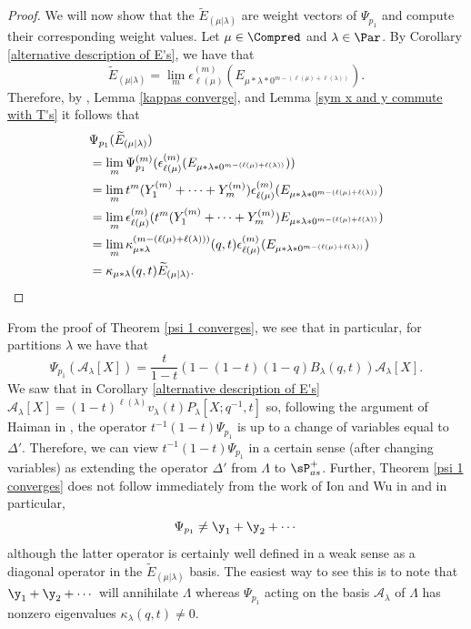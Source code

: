 \begin{proof}
We will now show that the $\widetilde{E}_{(\mu|\lambda)}$ are weight vectors of $\Psi_{p_1}$ and compute their corresponding weight values. Let $\mu \in \Compred$ and $\lambda \in \Par$. By Corollary \ref{alternative description of E's}, we have that 
$$ \widetilde{E}_{(\mu|\lambda)} = \lim_{m} \epsilon_{\ell(\mu)}^{(m)}(E_{\mu*\lambda*0^{m-(\ell(\mu)+\ell(\lambda))}}). $$
Therefore, by \cite[Proposition 6.21]{Ion_2022}, Lemma \ref{kappas converge}, and Lemma \ref{sym x and y commute with T's} it follows that 
\begin{align*}
   & \Psi_{p_1}(\widetilde{E}_{(\mu|\lambda)})\\
   &= \lim_{m} \Psi_{p_1}^{(m)}(\epsilon_{\ell(\mu)}^{(m)}(E_{\mu*\lambda*0^{m-(\ell(\mu)+\ell(\lambda))}}))\\
   &= \lim_{m} t^m(Y_1^{(m)}+\cdots+Y_m^{(m)})\epsilon_{\ell(\mu)}^{(m)}(E_{\mu*\lambda*0^{m-(\ell(\mu)+\ell(\lambda))}})\\
   &= \lim_{m} \epsilon_{\ell(\mu)}^{(m)}( t^m(Y_1^{(m)}+\cdots+Y_m^{(m)})E_{\mu*\lambda*0^{m-(\ell(\mu)+\ell(\lambda))}} )\\
   &= \lim_{m} \kappa_{\mu*\lambda}^{(m-(\ell(\mu)+\ell(\lambda)))}(q,t)\epsilon_{\ell(\mu)}^{(m)}(E_{\mu*\lambda*0^{m-(\ell(\mu)+\ell(\lambda))}})\\
   &= \kappa_{\mu*\lambda}(q,t)\widetilde{E}_{(\mu|\lambda)}. \qedhere
\end{align*} 
\end{proof}

\begin{rema}\label{remark about delta'}
From the proof of Theorem \ref{psi 1 converges}, we see that in particular, for partitions $\lambda$ we have that 
$$\Psi_{p_1}(\mathcal{A}_{\lambda}[X]) = \frac{t}{1-t}(1-(1-t)(1-q)B_{\lambda}(q,t))\mathcal{A}_{\lambda}[X] .$$ We saw that in Corollary \ref{alternative description of E's} $\mathcal{A}_{\lambda}[X] = (1-t)^{\ell(\lambda)}v_{\lambda}(t)P_{\lambda}[X;q^{-1},t]$ so,  following the argument of Haiman in \cite[Definition after Corollary 2.3]{HMacDG}, the operator $t^{-1}(1-t)\Psi_{p_1}$ is up to a change of variables equal to $\Delta'$. Therefore, we can view $t^{-1}(1-t)\Psi_{p_1}$ in a certain sense (after changing variables) as extending the operator $\Delta'$ from $\Lambda$ to $\sP_{as}^{+}$. Further, Theorem \ref{psi 1 converges} does not follow immediately from the work of Ion and Wu in \cite{Ion_2022} and in particular, 
$$ \Psi_{p_1} \neq \y_1+\y_2+ \cdots$$
although the latter operator is certainly well defined in a weak sense as a diagonal operator in the $\widetilde{E}_{(\mu|\lambda)}$ basis. The easiest way to see this is to note that $\y_1+\y_2+ \cdots$ will annihilate $\Lambda$ whereas $\Psi_{p_1}$ acting on the basis $\mathcal{A}_{\lambda}$ of $\Lambda$ has nonzero eigenvalues $\kappa_{\lambda}(q,t) \neq 0$.
\end{rema}

